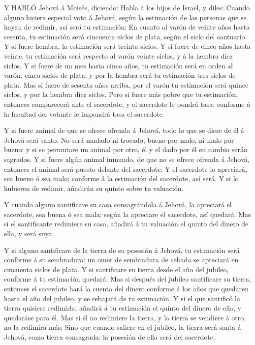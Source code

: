  Y HABLÓ Jehová á Moisés, diciendo:  Habla á los
hijos de Israel, y diles: Cuando alguno hiciere especial voto á Jehová,
según la estimación de las personas que se hayan de redimir, así será tu
estimación:  En cuanto al varón de veinte años hasta
sesenta, tu estimación será cincuenta siclos de plata, según el siclo
del santuario.  Y si fuere hembra, la estimación será
treinta siclos.  Y si fuere de cinco años hasta veinte, tu
estimación será respecto al varón veinte siclos, y á la hembra diez
siclos.  Y si fuere de un mes hasta cinco años, tu
estimación será en orden al varón, cinco siclos de plata; y por la
hembra será tu estimación tres siclos de plata.  Mas si
fuere de sesenta años arriba, por el varón tu estimación será quince
siclos, y por la hembra diez siclos.  Pero si fuere más
pobre que tu estimación, entonces comparecerá ante el sacerdote, y el
sacerdote le pondrá tasa: conforme á la facultad del votante le impondrá
tasa el sacerdote.

 Y si fuere animal de que se ofrece ofrenda á Jehová, todo
lo que se diere de él á Jehová será santo.  No será mudado
ni trocado, bueno por malo, ni malo por bueno: y si se permutare un
animal por otro, él y el dado por él en cambio serán sagrados.
 Y si fuere algún animal inmundo, de que no se ofrece
ofrenda á Jehová, entonces el animal será puesto delante del sacerdote:
 Y el sacerdote lo apreciará, sea bueno ó sea malo;
conforme á la estimación del sacerdote, así será.  Y si lo
hubieren de redimir, añadirán su quinto sobre tu valuación.

 Y cuando alguno santificare su casa consagrándola á
Jehová, la apreciará el sacerdote, sea buena ó sea mala: según la
apreciare el sacerdote, así quedará.  Mas si el
santificante redimiere su casa, añadirá á tu valuación el quinto del
dinero de ella, y será suya.

 Y si alguno santificare de la tierra de su posesión á
Jehová, tu estimación será conforme á su sembradura: un omer de
sembradura de cebada se apreciará en cincuenta siclos de plata.
 Y si santificare su tierra desde el año del jubileo,
conforme á tu estimación quedará.  Mas si después del
jubileo santificare su tierra, entonces el sacerdote hará la cuenta del
dinero conforme á los años que quedaren hasta el año del jubileo, y se
rebajará de tu estimación.  Y si el que santificó la tierra
quisiere redimirla, añadirá á tu estimación el quinto del dinero de
ella, y quedaráse para él.  Mas si él no redimiere la
tierra, y la tierra se vendiere á otro, no la redimirá más;
 Sino que cuando saliere en el jubileo, la tierra será
santa á Jehová, como tierra consagrada: la posesión de ella será del
sacerdote.

